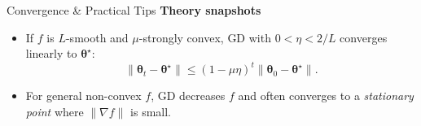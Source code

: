 \documentclass[aspectratio=169]{beamer}
\begin{document}
	\begin{frame}{Convergence \& Practical Tips}
		\textbf{Theory snapshots}
		\begin{itemize}
			\item If $f$ is $L$-smooth and $\mu$-strongly convex, GD with $0<\eta<2/L$ converges linearly to $\bm{\theta}^\star$:
			\[
			\|\bm{\theta}_{t}-\bm{\theta}^\star\| \le (1-\mu\eta)^t \|\bm{\theta}_0-\bm{\theta}^\star\|.
			\]
			\item For general non-convex $f$, GD decreases $f$ and often converges to a \emph{stationary point} where $\|\nabla f\|$ is small.
		\end{itemize}
		
	\end{frame}


\end{document}
